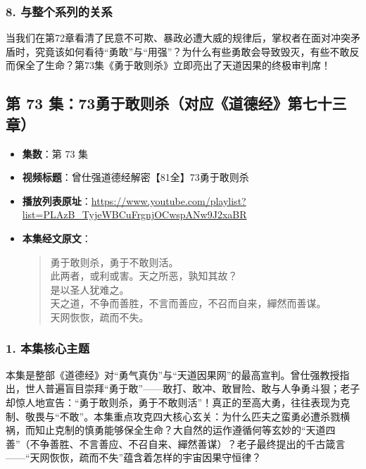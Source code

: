 \subsubsection{8. 与整个系列的关系}
当我们在第72章看清了民意不可欺、暴政必遭大威的规律后，掌权者在面对冲突矛盾时，究竟该如何看待“勇敢”与“用强”？为什么有些勇敢会导致毁灭，有些不敢反而保全了生命？第73集《勇于敢则杀》立即亮出了天道因果的终极审判席！

\clearpage

\subsection{第 73 集：73勇于敢则杀（对应《道德经》第七十三章）}
\label{sec:ep73}

\begin{itemize}
    \item \textbf{集数}：第 73 集
    \item \textbf{视频标题}：曾仕强道德经解密【81全】73勇于敢则杀
    \item \textbf{播放列表原址}：\url{https://www.youtube.com/playlist?list=PLAzB_TyjeWBCuFrgnjOCwspANw9J2xaBR}
    \item \textbf{本集经文原文}：
    \begin{quote}\kaishu
    勇于敢则杀，勇于不敢则活。\\
    此两者，或利或害。天之所恶，孰知其故？\\
    是以圣人犹难之。\\
    天之道，不争而善胜，不言而善应，不召而自来，繟然而善谋。\\
    天网恢恢，疏而不失。
    \end{quote}
\end{itemize}

\subsubsection{1. 本集核心主题}
本集是整部《道德经》对“勇气真伪”与“天道因果网”的最高宣判。曾仕强教授指出，世人普遍盲目崇拜“勇于敢”——敢打、敢冲、敢冒险、敢与人争勇斗狠；老子却惊人地宣告：“勇于敢则杀，勇于不敢则活”！真正的至高大勇，往往表现为克制、敬畏与“不敢”。本集重点攻克四大核心玄关：为什么匹夫之蛮勇必遭杀戮横祸，而知止克制的慎勇能够保全生命？大自然的运作遵循何等玄妙的“天道四善”（不争善胜、不言善应、不召自来、繟然善谋）？老子最终提出的千古箴言——“天网恢恢，疏而不失”蕴含着怎样的宇宙因果守恒律？

